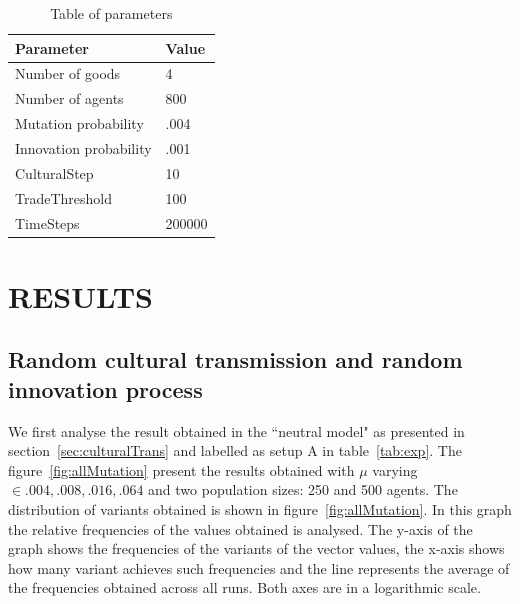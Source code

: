 \documentclass{wscpaperproc}
\begin{document}
\begin{table}
\begin{center}
\begin{tabular}{@{}ll@{}}
\toprule
Parameter & Value \\
\midrule
Number of goods & 4 \\
Number of agents & 800 \\
Mutation probability & .004 \\
Innovation probability & .001\\
CulturalStep &  10 \\
TradeThreshold & 100  \\
TimeSteps & 200000 \\
\bottomrule
\end{tabular}
\caption{Table of parameters}\label{tab:parameters}
\end{center}
\end{table}






\section{RESULTS}
\subsection{Random cultural transmission and random innovation process}

We first analyse the result obtained in the ``neutral model" as presented in section~\ref{sec:culturalTrans} and labelled as setup A in table~\ref{tab:exp}. The figure~\ref{fig:allMutation} present the results obtained with $\mu$ varying $\in {.004,.008,.016,.064}$ and two population sizes: 250 and 500 agents. The distribution of variants obtained is shown in figure~\ref{fig:allMutation}. In this graph the relative frequencies of the values obtained is analysed. The y-axis of the graph shows the frequencies of the variants of the vector values, the x-axis shows how many variant achieves such frequencies and the line represents the average of the frequencies obtained across all runs. Both axes are in a logarithmic scale.
\end{document}
